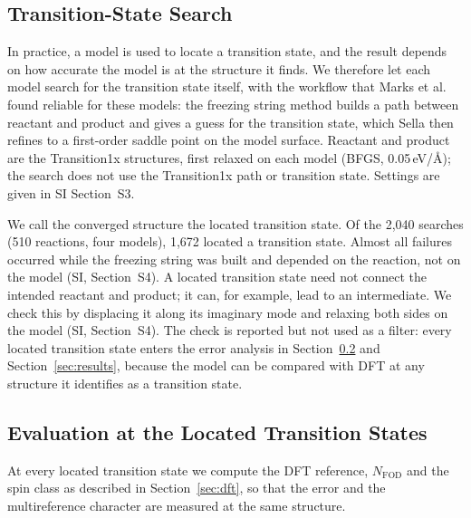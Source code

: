 \subsection{Transition-State Search}
\label{sec:search}
In practice, a model is used to locate a transition state, and the result depends on how accurate the model is at the structure it finds. We therefore let each model search for the transition state itself, with the workflow that Marks et al.\cite{marks2026fsm} found reliable for these models: the freezing string method\cite{behn2011fsm} builds a path between reactant and product and gives a guess for the transition state, which Sella\cite{hermes2022sella} then refines to a first-order saddle point on the model surface. Reactant and product are the Transition1x structures, first relaxed on each model (BFGS, 0.05\,eV/\AA); the search does not use the Transition1x path or transition state. Settings are given in SI Section~S3.

We call the converged structure the located transition state. Of the 2,040 searches (510 reactions, four models), 1,672 located a transition state. Almost all failures occurred while the freezing string was built and depended on the reaction, not on the model (SI, Section~S4). A located transition state need not connect the intended reactant and product; it can, for example, lead to an intermediate. We check this by displacing it along its imaginary mode and relaxing both sides on the model (SI, Section~S4). The check is reported but not used as a filter: every located transition state enters the error analysis in Section~\ref{sec:errors} and Section~\ref{sec:results}, because the model can be compared with DFT at any structure it identifies as a transition state.

\subsection{Evaluation at the Located Transition States}
\label{sec:errors}
At every located transition state we compute the DFT reference, $N_\mathrm{FOD}$ and the spin class as described in Section~\ref{sec:dft}, so that the error and the multireference character are measured at the same structure.

